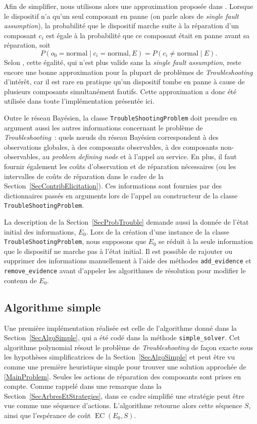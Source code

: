 \documentclass[a4paper,11pt]{article}
\theoremstyle{plain}
\theoremstyle{definition}
\DeclareMathOperator{\EC}{EC}
\begin{document}
Afin de simplifier, nous utilisons alors une approximation proposée dans \cite{Heckerman_1995, heckerman1994troubleshooting}. Lorsque le dispositif n'a qu'un seul composant en panne (on parle alors de \emph{single fault assumption}), la probabilité que le dispositif marche suite à la réparation d'un composant $c_i$ est égale à la probabilité que ce composant était en panne avant sa réparation, soit
\[
P(o_0 = \text{normal} \mid c_i = \text{normal}, E) = P(c_i \neq \text{normal} \mid E).
\]
Selon \cite{Heckerman_1995, heckerman1994troubleshooting}, cette égalité, qui n'est plus valide sans la \emph{single fault assumption}, reste encore une bonne approximation pour la plupart de problèmes de \emph{Troubleshooting} d'intérêt, car il est rare en pratique qu'un dispositif tombe en panne à cause de plusieurs composants simultanément fautifs. Cette approximation a donc été utilisée dans toute l'implémentation présentée ici.

Outre le réseau Bayésien, la classe \texttt{TroubleShootingProblem} doit prendre en argument aussi les autres informations concernant le problème de \emph{Troubleshooting}~: quels nœuds du réseau Bayésien correspondent à des observations globales, à des composants observables, à des composants non-observables, au \emph{problem defining node} et à l'appel au service. En plus, il faut fournir également les coûts d'observation et de réparation nécessaires (ou les intervalles de coûts de réparation dans le cadre de la Section~\ref{SecContribElicitation}). Ces informations sont fournies par des dictionnaires passés en arguments lors de l'appel au constructeur de la classe \texttt{TroubleShootingProblem}.

La description de la Section~\ref{SecProbTrouble} demande aussi la donnée de l'état initial des informations, $E_0$. Lors de la création d'une instance de la classe \texttt{TroubleShootingProblem}, nous supposons que $E_0$ se réduit à la seule information que le dispositif ne marche pas à l'état initial. Il est possible de rajouter ou supprimer des informations manuellement à l'aide des méthodes \texttt{add\_evidence} et \texttt{remove\_evidence} avant d'appeler les algorithmes de résolution pour modifier le contenu de $E_0$.

\subsection{Algorithme simple}
\label{SecImplAlgoSimple}

Une première implémentation réalisée est celle de l'algorithme donné dans la Section~\ref{SecAlgoSimple}, qui a été codé dans la méthode \texttt{simple\_solver}. Cet algorithme polynomial résout le problème de \emph{Troubleshooting} de façon exacte sous les hypothèses simplificatrices de la Section~\ref{SecAlgoSimple} et peut être vu comme une première heuristique simple pour trouver une solution approchée de \eqref{MainProblem}. Seules les actions de réparation des composants sont prises en compte. Comme rappelé dans une remarque dans la Section~\ref{SecArbresEtStrategies}, dans ce cadre simplifié une stratégie peut être vue comme une séquence d'actions. L'algorithme retourne alors cette séquence $S$, ainsi que l'espérance de coût $\EC(E_0, S)$.
\end{document}
